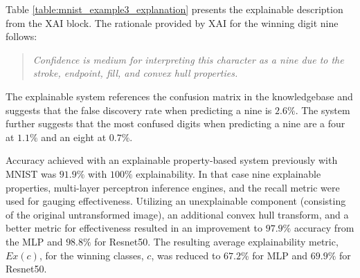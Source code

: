 \begin{table}[H]
    \renewcommand{\arraystretch}{1.3}
     \label{table:mnist_example3_explanation}
    \begin{center}
    \end{center}
\end{table}

Table \ref{table:mnist_example3_explanation} presents the explainable description from the
XAI block.  The rationale provided by XAI for the winning digit nine follows:

\begin{quote}
    \textit{Confidence is medium for interpreting this character as a nine due to the stroke, endpoint, fill, and convex hull properties.}
\end{quote}

The explainable system references the confusion matrix in the knowledgebase and
suggests that the false discovery rate when predicting a nine is $2.6\%$. The
system further suggests that the most confused digits when predicting a nine are
a four at $1.1\%$ and an eight at $0.7\%$.

Accuracy achieved with an explainable property-based system previously with
MNIST was $91.9\%$ with $100\%$ explainability\cite{whitten21}.  In that case
nine explainable properties, multi-layer perceptron inference engines, and the
recall metric were used for gauging effectiveness. Utilizing an unexplainable
component (consisting of the original untransformed image), an additional convex
hull transform, and a better metric for effectiveness resulted in an improvement
to $97.9\%$ accuracy from the MLP and $98.8\%$ for Resnet50. The resulting
average explainability metric, $Ex(c)$, for the winning classes, $c$, was
reduced to $67.2$\% for MLP and $69.9\%$ for Resnet50.

